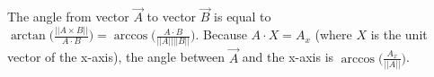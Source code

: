
The angle from vector $\vec{A}$ to vector $\vec{B}$ is equal to $\arctan \big( \frac{|| A \times B ||}{A \cdot B} \big) = \arccos \big( \frac{A \cdot B}{||A||||B||} \big)$. Because $A \cdot X = A_x$ (where $X$ is the unit vector of the x-axis), the angle between $\vec{A}$ and the x-axis is $\arccos \big( \frac{A_x}{||A||} \big)$.



\newpage